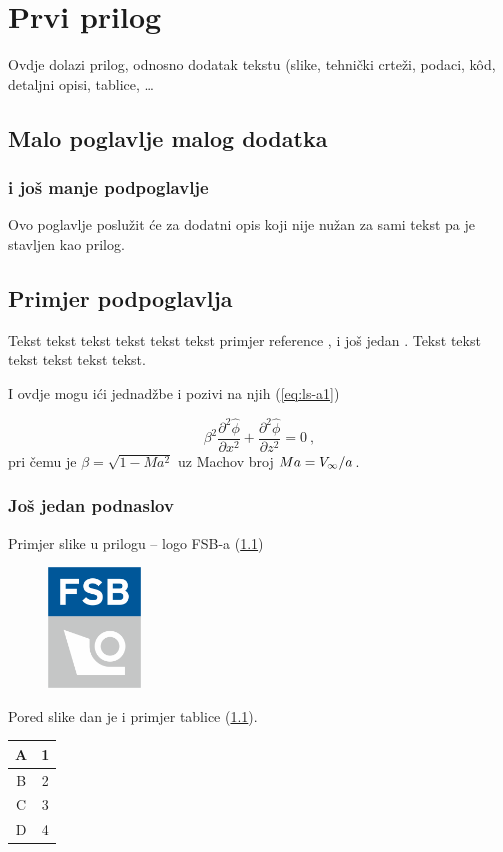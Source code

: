 \chapter{Prvi prilog}
Ovdje dolazi prilog, odnosno dodatak tekstu (slike, tehnički crteži, podaci,
k\^ od, detaljni opisi, tablice, \ldots

\newpage 
\section{Malo poglavlje malog dodatka}
\subsection{i još manje podpoglavlje}
Ovo poglavlje poslu\v{z}it \'{c}e za dodatni opis koji nije nužan za sami
tekst pa je stavljen kao prilog.

\section{Primjer podpoglavlja}
Tekst tekst tekst tekst tekst tekst primjer reference
\cite{mastersthesis-minimal}, i jo\v{s} jedan \cite{inbook-full}.
Tekst tekst tekst tekst tekst tekst.

I ovdje mogu ići jednadžbe i pozivi na njih (\eqref{eq:ls-a1}) 

\begin{equation}\label{eq:ls-a1}
\beta ^2 \frac{{\partial ^2 \hat \phi }}
{{\partial x^2 }} + \frac{{\partial ^2 \hat \phi }}
{{\partial z^2 }} = 0\:,
\end{equation}
pri čemu je $\beta=\sqrt{1-Ma^2}$ uz Machov broj $Ma=\hbox{$V_{\infty}$}/a$.
%
%

\subsection{Još jedan podnaslov}
Primjer slike u prilogu -- logo FSB-a (\ref{figa1})
\begin{figure}[h]
  \centering
  \includegraphics[height=3.2cm]{fsb_logo_v}
  \label{figa1}
\end{figure}

Pored slike dan je i primjer tablice (\ref{tablicaa}).
\begin{table}[!h]
\label{tablicaa}
  \centering
\begin{tabular}{|c|c|} \hline
    A & 1 \\\hline
    B & 2 \\\hline
    C & 3 \\\hline
    D & 4 \\ \hline
\end{tabular}
\end{table}

